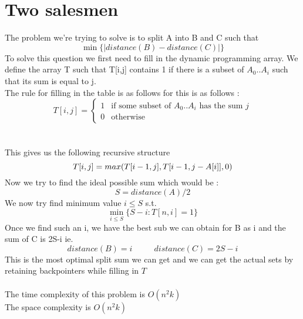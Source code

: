 \documentclass{article}
\begin{document}
    

\section{Two salesmen}
\label{sec:Two salesmen}
    The problem we're trying to solve is to split A into B and C such that
    \[\min \{|distance(B) - distance(C)|\}\]
    To solve this question we first need to fill in the dynamic programming array. We define the array T such that T[i,j] contains 1 if there is a subset of $A_0 .. A_i$ such that its sum is equal to j.\\
    The rule for filling in the table is as follows for this is as follows : \\
    \[
    T[i,j] =
    \begin{cases}
        1 &\text{if some subset of }A_0 .. A_i\text{ has the sum }j\\
        0 &\text{otherwise}
    \end{cases}
    \]\\\\
    This gives us the following recursive structure
    \[T[i,j] = max(T[i-1,j], T[i-1, j-A[i]], 0)\\\]
    Now we try to find the ideal possible sum which would be :
    \[S = distance(A)/2\]
    We now try find minimum value $i \leq S$ s.t.
    \[\min_{i \leq S} \{S - i : T[n, i] = 1\}\]
    Once we find such an i, we have the best sub we can obtain for B as i and the sum of C is 2S-i ie.
    \[distance(B) = i \ \ \ \ \ \ \ \ \ \ \ \ distance(C) = 2S - i\]
    This is the most optimal split sum we can get and we can get the actual sets by retaining backpointers while filling in $T$\\\\
    The time complexity of this problem is $O(n^2k)$\\
    The space complexity is $O(n^2k)$
\end{document}
